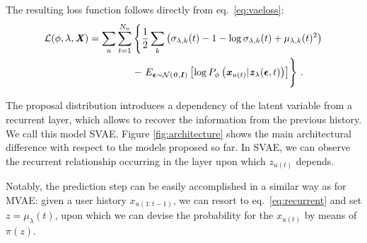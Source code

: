 \documentclass[sigconf]{acmart}
\newcommand{\bs}[1]{\ensuremath{\bm{\mathit{#1}}}}
\numberwithin{equation}{section}
\begin{document}
The resulting loss function follows directly from eq.~\ref{eq:vaeloss}: 
\begin{equation*}
\begin{split}
\mathcal{L}(\phi, \lambda,\bs{X})  =  \sum_u \sum_{t=1}^{N_u}&\left\{  
\frac{1}{2}
    \sum_k \left(\sigma_{\lambda,k} (t)  - 1 - 
      \log\sigma_{\lambda,k}(t) + \mu_{\lambda,k}(t)^2
\right)\right.\\
& - \left.
\vphantom{\sum_{k} k} E_{\bs{\epsilon} \sim \mathcal{N}(\bs{0}, \bs{I})} \left[
    \log P_\phi\left(\bs{x}_{u(t)} | \bs{z}_\lambda(\bs{\epsilon}, t)\right) \right]
\right\} \, .
\end{split}
\end{equation*}



The proposal distribution introduces a
dependency of the latent variable from a recurrent layer, which allows
to recover the information from the previous history. We call this
model SVAE. Figure \ref{fig:architecture} shows the main
architectural difference with respect to the models proposed so
far. In SVAE, we can observe the recurrent relationship occurring in the layer
upon which $\bs{z}_{u(t)}$ depends. 

Notably, the prediction step can be easily accomplished in a similar
way as for MVAE: given a user history $\bs{x}_{u(1:t-1)}$, we can resort
to eq.~\ref{eq:recurrent} and set $\bs{z} =
\bs{\mu}_\lambda(t)$, upon which we can devise the probability for the
$\bs{x}_{u(t)}$ by means of $\pi(\bs{z})$. 
\end{document}
